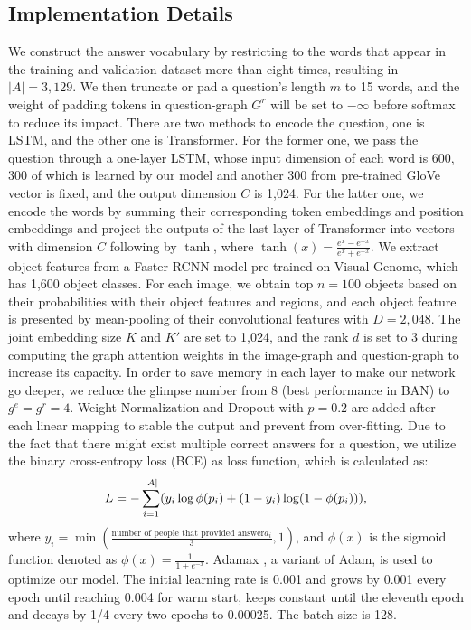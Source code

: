 \documentclass[10pt,twocolumn,letterpaper]{article}
\begin{document}
\subsection{Implementation Details}
We construct the answer vocabulary by restricting to the words that appear in the training and validation dataset more than eight times, resulting in $|A| = 3,129$. We then truncate or pad a question's length $m$ to 15 words, and the weight of padding tokens in question-graph $G^r$ will be set to $-\infty$ before softmax to reduce its impact. There are two methods to encode the question, one is LSTM, and the other one is Transformer. For the former one, we pass the question through a one-layer LSTM, whose input dimension of each word is 600, 300 of which is learned by our model and another 300 from pre-trained GloVe vector \cite{pennington2014glove} is fixed, and the output dimension $C$ is 1,024. For the latter one, we encode the words by summing their corresponding token embeddings and position embeddings and project the outputs of the last layer of Transformer into vectors with dimension $C$ following by $\tanh$, where $\tanh(x)=\frac{e^x-e^{-x}}{e^x+e^{-x}}$. We extract object features from a Faster-RCNN model \cite{anderson2018bottom} pre-trained on Visual Genome, which has 1,600 object classes. For each image, we obtain top $n = 100$ objects based on their probabilities with their object features and regions, and each object feature is presented by mean-pooling of their convolutional features with $D = 2,048$. The joint embedding size $K$ and $K'$ are set to 1,024, and the rank $d$ is set to 3 during computing the graph attention weights in the image-graph and question-graph to increase its capacity. In order to save memory in each layer to make our network go deeper, we reduce the glimpse number from 8 (best performance in BAN) to $g^e = g^r = 4$. Weight Normalization \cite{salimans2016weight} and Dropout \cite{srivastava2014dropout} with $p = 0.2$ are added after each linear mapping to stable the output and prevent from over-fitting. Due to the fact that there might exist multiple correct answers for a question, we utilize the binary cross-entropy loss (BCE) as loss function, which is calculated as:
\vspace{-5pt}
\begin{equation}
L = -\sum_{i = 1}^{|A|}(y_i \log \phi(p_i) + (1-y_i)\log(1 - \phi(p_i))),
\vspace{-5pt}
\end{equation}
where $y_i= \min(\frac{\text{number of people that provided answer} a_i}{3}, 1)$, and $\phi(x)$ is the sigmoid function denoted as $\phi(x)=\frac{1}{1 + e^{-x}}$. Adamax \cite{kingma2014adam}, a variant of Adam, is used to optimize our model. The initial learning rate is 0.001 and grows by 0.001 every epoch until reaching 0.004 for warm start, keeps constant until the eleventh epoch and decays by 1/4 every two epochs to 0.00025. The batch size is 128. 
\end{document}

